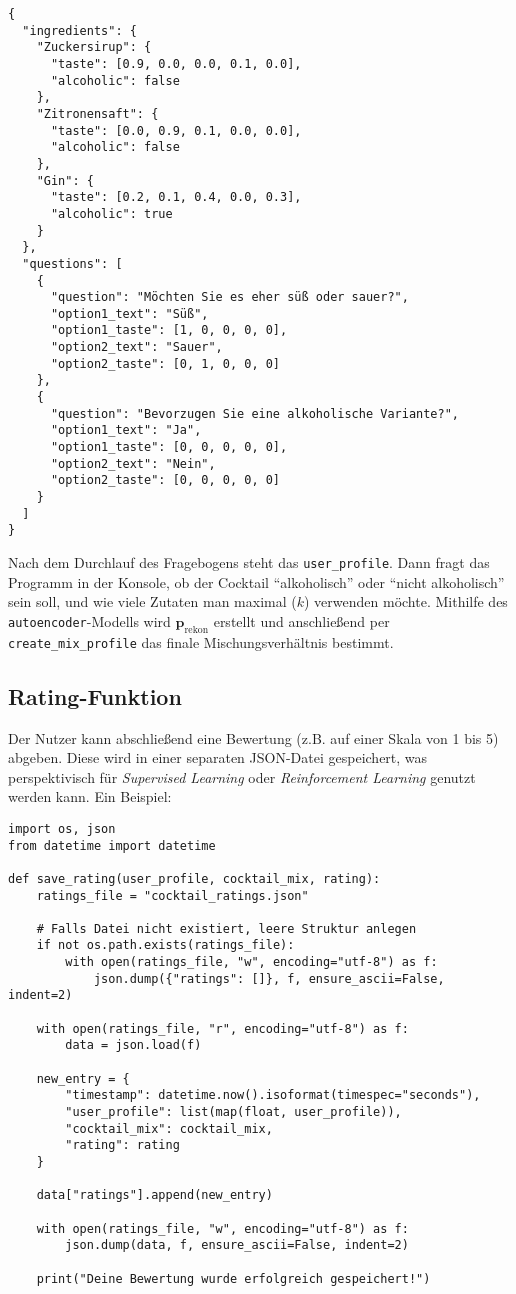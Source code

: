 \documentclass[12pt,a4paper]{report}
\begin{document}
\begin{lstlisting}[style=customjson, caption={Exemplarische JSON mit Fragen und Zutaten}]
{
  "ingredients": {
    "Zuckersirup": {
      "taste": [0.9, 0.0, 0.0, 0.1, 0.0],
      "alcoholic": false
    },
    "Zitronensaft": {
      "taste": [0.0, 0.9, 0.1, 0.0, 0.0],
      "alcoholic": false
    },
    "Gin": {
      "taste": [0.2, 0.1, 0.4, 0.0, 0.3],
      "alcoholic": true
    }
  },
  "questions": [
    {
      "question": "Möchten Sie es eher süß oder sauer?",
      "option1_text": "Süß",
      "option1_taste": [1, 0, 0, 0, 0],
      "option2_text": "Sauer",
      "option2_taste": [0, 1, 0, 0, 0]
    },
    {
      "question": "Bevorzugen Sie eine alkoholische Variante?",
      "option1_text": "Ja",
      "option1_taste": [0, 0, 0, 0, 0],
      "option2_text": "Nein",
      "option2_taste": [0, 0, 0, 0, 0]
    }
  ]
}
\end{lstlisting}

Nach dem Durchlauf des Fragebogens steht das \texttt{user\_profile}. Dann fragt das Programm in der Konsole, ob der Cocktail \enquote{alkoholisch} oder \enquote{nicht alkoholisch} sein soll, und wie viele Zutaten man maximal (\(k\)) verwenden möchte. Mithilfe des \texttt{autoencoder}-Modells wird \(\mathbf{p}_{\text{rekon}}\) erstellt und anschließend per \texttt{create\_mix\_profile} das finale Mischungsverhältnis bestimmt.

\subsection{Rating-Funktion}
Der Nutzer kann abschließend eine Bewertung (z.B. auf einer Skala von 1 bis 5) abgeben. Diese wird in einer separaten JSON-Datei gespeichert, was perspektivisch für \emph{Supervised Learning} oder \emph{Reinforcement Learning} genutzt werden kann. Ein Beispiel:

\begin{lstlisting}[style=custompython, caption={Speichern einer Nutzerbewertung in einer JSON-Datei}]
import os, json
from datetime import datetime

def save_rating(user_profile, cocktail_mix, rating):
    ratings_file = "cocktail_ratings.json"
    
    # Falls Datei nicht existiert, leere Struktur anlegen
    if not os.path.exists(ratings_file):
        with open(ratings_file, "w", encoding="utf-8") as f:
            json.dump({"ratings": []}, f, ensure_ascii=False, indent=2)
    
    with open(ratings_file, "r", encoding="utf-8") as f:
        data = json.load(f)
    
    new_entry = {
        "timestamp": datetime.now().isoformat(timespec="seconds"),
        "user_profile": list(map(float, user_profile)),
        "cocktail_mix": cocktail_mix,
        "rating": rating
    }
    
    data["ratings"].append(new_entry)
    
    with open(ratings_file, "w", encoding="utf-8") as f:
        json.dump(data, f, ensure_ascii=False, indent=2)
    
    print("Deine Bewertung wurde erfolgreich gespeichert!")
\end{lstlisting}
\end{document}
